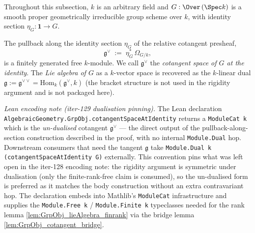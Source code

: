 Throughout this subsection, \(k\) is an arbitrary field and \(G : \Over\,(\Spec k)\) is a smooth proper geometrically irreducible group scheme over \(k\), with identity section \(\eta_G : \mathbf{1} \to G\).

\begin{lemma}
  \label{lem:GrpObj_cotangentSpace}
  The pullback along the identity section \(\eta_G\) of the relative cotangent presheaf,
  \[
    \mathfrak g^{\vee} \;:=\; \eta_G^{*}\,\Omega_{G/k},
  \]
  is a finitely generated free \(k\)-module. We call \(\mathfrak g^{\vee}\) the \emph{cotangent space of \(G\) at the identity}. The \emph{Lie algebra of \(G\)} as a \(k\)-vector space is recovered as the \(k\)-linear dual \(\mathfrak g := \mathfrak g^{\vee\vee} = \mathrm{Hom}_{k}(\mathfrak g^{\vee}, k)\) (the bracket structure is not used in the rigidity argument and is not packaged here).

  \emph{Lean encoding note (iter-129 dualisation pinning).} The Lean declaration \texttt{AlgebraicGeometry.GrpObj.cotangentSpaceAtIdentity} returns a \texttt{ModuleCat k} which is the \emph{un-dualised} cotangent \(\mathfrak g^{\vee}\) — the direct output of the pullback-along-section construction described in the proof, with no internal \texttt{Module.Dual} hop. Downstream consumers that need the tangent \(\mathfrak g\) take \texttt{Module.Dual k (cotangentSpaceAtIdentity G)} externally. This convention pins what was left open in the iter-128 encoding note: the rigidity argument is symmetric under dualisation (only the finite-rank-free claim is consumed), so the un-dualised form is preferred as it matches the body construction without an extra contravariant hop. The declaration embeds into Mathlib's \texttt{ModuleCat} infrastructure and supplies the \texttt{Module.Free k} / \texttt{Module.Finite k} typeclasses needed for the rank lemma \cref{lem:GrpObj_lieAlgebra_finrank} via the bridge lemma \cref{lem:GrpObj_cotangent_bridge}.
\end{lemma}

